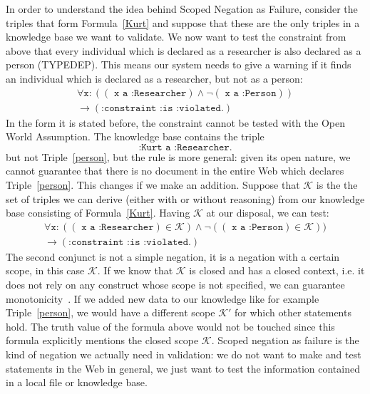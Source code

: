 In order to understand the idea behind Scoped Negation as Failure,
consider the triples that form Formula~\ref{Kurt}
and suppose that these are the only triples in a 
knowledge base we want to validate. We now want to test the constraint from above that every individual which is declared as a researcher is also declared 
as a person (TYPEDEP). This means our system needs to give a warning if it finds an individual which is declared as a researcher, but not as a person:
\begin{multline}\label{constraint1}
 \forall \texttt{x}: ((\texttt{ x a :Researcher}) \wedge \neg (\texttt{ x a :Person}))\\ \rightarrow (\texttt{:constraint :is :violated.})
\end{multline}
In the form it is stated before, the constraint cannot be tested with the Open World Assumption. 
The knowledge base contains the triple 
\[\texttt{:Kurt a :Researcher.}\]
but not Triple~\ref{person},
but the rule is more general: given its open nature, 
we cannot guarantee that there is no document in the entire Web which declares Triple~\ref{person}.
This changes if we make an addition. Suppose that $\mathcal{K}$ is the
the set of triples
we can derive (either with or without reasoning) from our knowledge base consisting of Formula~\ref{Kurt}. Having $\mathcal{K}$ at our disposal, we can test:
\begin{multline}
 \forall \texttt{x}: ((\texttt{ x a :Researcher})\in \mathcal{K}) \wedge \neg ((\texttt{ x a :Person})\in \mathcal{K}))\\ \rightarrow (\texttt{:constraint :is :violated.})
\end{multline}
The second conjunct is not a simple negation, it is a negation with a certain scope, in this case $\mathcal{K}$. 
If we know that $\mathcal{K}$ is closed and has a closed context, i.e. it does not rely on any construct whose scope is not specified, we can guarantee monotonicity~\cite{polleres2006rules}.
If we added new 
data to our knowledge like for example Triple~\ref{person}, we would have a different scope $\mathcal{K}'$ for which other statements hold. The truth value of the formula above 
would not be touched since this formula explicitly mentions the closed scope $\mathcal{K}$. %
Scoped negation as failure is the kind of negation we actually need in \rdf validation: we do not want to make and
test
statements in the Web in general, we just want to test the information contained in a local file or knowledge base.


